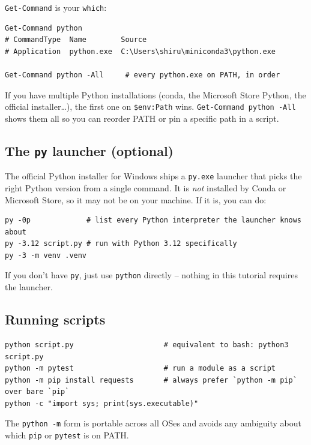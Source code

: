 \documentclass[11pt,a4paper]{article}
\newcommand{\cmd}[1]{\texttt{\textcolor{pwshKw}{#1}}}
\begin{document}
\cmd{Get-Command} is your \texttt{which}:

\begin{lstlisting}[style=pwshstyle]
Get-Command python
# CommandType  Name        Source
# Application  python.exe  C:\Users\shiru\miniconda3\python.exe

Get-Command python -All     # every python.exe on PATH, in order
\end{lstlisting}

If you have multiple Python installations (conda, the Microsoft Store
Python, the official installer\dots), the first one on
\texttt{\$env:Path} wins. \cmd{Get-Command python -All} shows them
all so you can reorder PATH or pin a specific path in a script.

\subsection*{The \texttt{py} launcher (optional)}

The official Python installer for Windows ships a \texttt{py.exe}
launcher that picks the right Python version from a single command.
It is \emph{not} installed by Conda or Microsoft Store, so it may not
be on your machine. If it is, you can do:

\begin{lstlisting}[style=pwshstyle]
py -0p             # list every Python interpreter the launcher knows about
py -3.12 script.py # run with Python 3.12 specifically
py -3 -m venv .venv
\end{lstlisting}

If you don't have \texttt{py}, just use \texttt{python} directly --
nothing in this tutorial requires the launcher.

\subsection*{Running scripts}

\begin{lstlisting}[style=pwshstyle]
python script.py                     # equivalent to bash: python3 script.py
python -m pytest                     # run a module as a script
python -m pip install requests       # always prefer `python -m pip` over bare `pip`
python -c "import sys; print(sys.executable)"
\end{lstlisting}

The \texttt{python -m} form is portable across all OSes and avoids any
ambiguity about which \texttt{pip} or \texttt{pytest} is on PATH.
\end{document}
